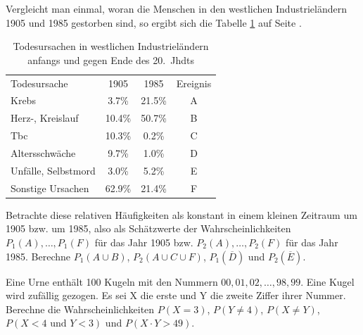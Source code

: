 \documentclass[%
11pt,%
twoside,%
titlepage,%
german,%
headsepline%
]{scrartcl}
\newcommand{\spaltenheight}{\rule{0mm}{3ex}}
\newcommand{\spaltensep}{\\[1ex]}
\begin{document}
\begin{ueb}[Todesursachen]
Vergleicht man einmal, woran die Menschen in den westlichen Industrieländern 1905 und 1985 gestorben sind, so ergibt sich die Tabelle \ref{tab:tod} auf Seite \pageref{tab:tod}.

\begin{table}[]
\centering
\begin{tabular}{|l|c|c|c|}
\hline
\rowcolor{Gray}\spaltenheight Todesursache & 1905 & 1985 & Ereignis\spaltensep \hhline{|====|}
\rowcolor{lightyellow}\spaltenheight Krebs & 3.7\% & 21.5\% & A\spaltensep \hline
\rowcolor{Gray}\spaltenheight Herz-, Kreislauf & 10.4\% & 50.7\% & B\spaltensep \hline
\rowcolor{lightyellow}\spaltenheight Tbc & 10.3\% & 0.2\% & C\spaltensep \hline
\rowcolor{Gray}\spaltenheight Altersschwäche & 9.7\% & 1.0\% & D\spaltensep \hline
\rowcolor{lightyellow}\spaltenheight Unfälle, Selbstmord & 3.0\% & 5.2\% & E\spaltensep \hline
\rowcolor{Gray}\spaltenheight Sonstige Ursachen & 62.9\% & 21.4\% & F\spaltensep\hline
\end{tabular}
\normalsize
\caption{Todesursachen in westlichen In\-du\-strie\-län\-dern anfangs und gegen Ende des 20.~Jhdts}\label{tab:tod}
\end{table}

Betrachte diese relativen Häufigkeiten als konstant in einem kleinen Zeitraum um 1905 bzw. um 1985, also als Schätzwerte der Wahrscheinlichkeiten $P_1(A), \dots , P_1(F)$ für das Jahr 1905 bzw.
$P_2(A), \dots ,P_2(F)$ für das Jahr 1985. Berechne $P_1(A\cup B)$, $P_2(A \cup C \cup F)$, $P_1(\overline{D})$ und $P_2(\overline{E})$.
\end{ueb}

\begin{ueb}
Eine Urne enthält 100 Kugeln mit den Nummern $00,01,02, \dots ,98,99$. Eine Kugel wird zufällig gezogen. Es sei X die erste und Y die zweite Ziffer ihrer Nummer. Berechne die Wahrscheinlichkeiten $P(X = 3)$, $P(Y\neq 4)$, $P(X \neq Y)$, $P(X < 4\text{ und } Y < 3)$ und $P(X\cdot Y > 49)$.
\end{ueb}
\end{document}
